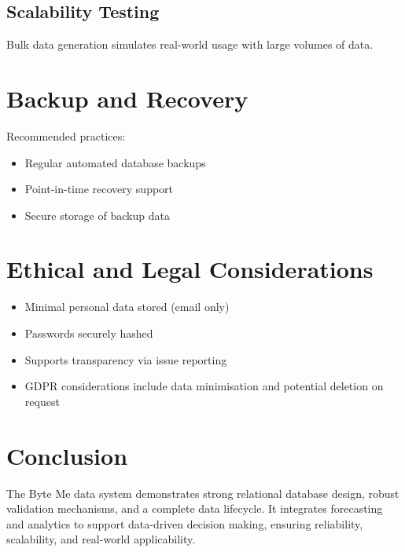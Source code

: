 \documentclass[12pt]{article}
\begin{document}
\subsection{Scalability Testing}
Bulk data generation simulates real-world usage with large volumes of data.

\section{Backup and Recovery}
Recommended practices:
\begin{itemize}
\item Regular automated database backups
\item Point-in-time recovery support
\item Secure storage of backup data
\end{itemize}

\section{Ethical and Legal Considerations}
\begin{itemize}
\item Minimal personal data stored (email only)
\item Passwords securely hashed
\item Supports transparency via issue reporting
\item GDPR considerations include data minimisation and potential deletion on request
\end{itemize}

\section{Conclusion}
The Byte Me data system demonstrates strong relational database design, robust validation mechanisms, and a complete data lifecycle. It integrates forecasting and analytics to support data-driven decision making, ensuring reliability, scalability, and real-world applicability.
\end{document}
